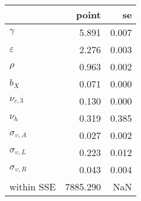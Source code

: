 \begin{tabular}{lrr}
\toprule
{} &     point &     se \\
\midrule
$\gamma$              &     5.891 &  0.007 \\
$\varepsilon$         &     2.276 &  0.003 \\
$\rho$                &     0.963 &  0.002 \\
$b_X$                 &     0.071 &  0.000 \\
$\nu_{c,3}$           &     0.130 &  0.000 \\
$\nu_{h}$             &     0.319 &  0.385 \\
$\sigma_{\upsilon,A}$ &     0.027 &  0.002 \\
$\sigma_{\upsilon,L}$ &     0.223 &  0.012 \\
$\sigma_{\upsilon,R}$ &     0.043 &  0.004 \\
within SSE            &  7885.290 &    NaN \\
\bottomrule
\end{tabular}
